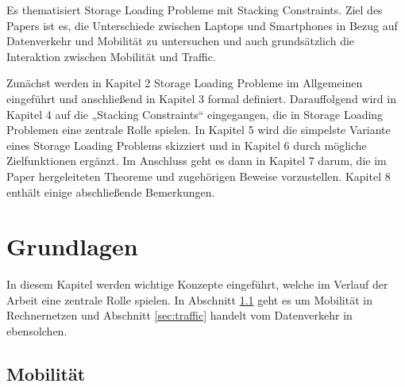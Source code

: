 \documentclass[12pt, a4paper]{article}
\begin{document}
Es thematisiert Storage Loading Probleme mit Stacking Constraints.
\newline\newline
Ziel des Papers ist es, die Unterschiede zwischen Laptops und Smartphones in Bezug auf Datenverkehr und Mobilität
zu untersuchen und auch grundsätzlich die Interaktion zwischen Mobilität und Traffic.

Zunächst werden in Kapitel 2 Storage Loading Probleme im Allgemeinen eingeführt
und anschließend in Kapitel 3 formal definiert. Darauffolgend wird in Kapitel 4 auf die
„Stacking Constraints“ eingegangen, die in Storage Loading Problemen eine zentrale
Rolle spielen. In Kapitel 5 wird die simpelste Variante eines Storage Loading Problems
skizziert und in Kapitel 6 durch mögliche Zielfunktionen ergänzt. Im Anschluss geht
es dann in Kapitel 7 darum, die im Paper hergeleiteten Theoreme und zugehörigen
Beweise vorzustellen. Kapitel 8 enthält einige abschließende Bemerkungen.

\pagebreak


\section{Grundlagen}

In diesem Kapitel werden wichtige Konzepte eingeführt, welche im Verlauf der Arbeit eine zentrale Rolle spielen.
In Abschnitt \ref{sec:mobility} geht es um Mobilität in Rechnernetzen und Abschnitt \ref{sec:traffic} handelt
vom Datenverkehr in ebensolchen.

\subsection{Mobilität}
\label{sec:mobility}
\end{document}

